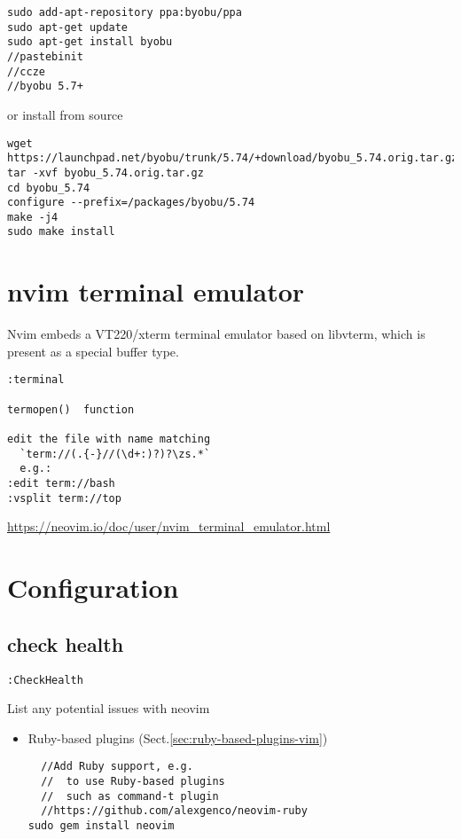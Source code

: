 \begin{verbatim}
sudo add-apt-repository ppa:byobu/ppa
sudo apt-get update
sudo apt-get install byobu
//pastebinit
//ccze
//byobu 5.7+
\end{verbatim}

or install from source
\begin{verbatim}
wget https://launchpad.net/byobu/trunk/5.74/+download/byobu_5.74.orig.tar.gz
tar -xvf byobu_5.74.orig.tar.gz
cd byobu_5.74
configure --prefix=/packages/byobu/5.74
make -j4
sudo make install 
\end{verbatim}

\section{nvim terminal emulator}
\label{sec:nvim-terminal-emulator}

Nvim embeds a VT220/xterm terminal emulator based on libvterm, which is present
as a special buffer type.
\begin{verbatim}
:terminal

termopen()  function

edit the file with name matching 
  `term://(.{-}//(\d+:)?)?\zs.*`
  e.g.:
:edit term://bash
:vsplit term://top

\end{verbatim}

\url{https://neovim.io/doc/user/nvim_terminal_emulator.html}

\section{Configuration}

\subsection{check health}
\label{sec:neovim-Ruby}

\begin{verbatim}
:CheckHealth
\end{verbatim}
List any potential issues with neovim

\begin{itemize}
  \item Ruby-based plugins (Sect.\ref{sec:ruby-based-plugins-vim})

\begin{verbatim}
  //Add Ruby support, e.g.
  //  to use Ruby-based plugins
  //  such as command-t plugin
  //https://github.com/alexgenco/neovim-ruby
sudo gem install neovim
\end{verbatim}
  
\end{itemize}



